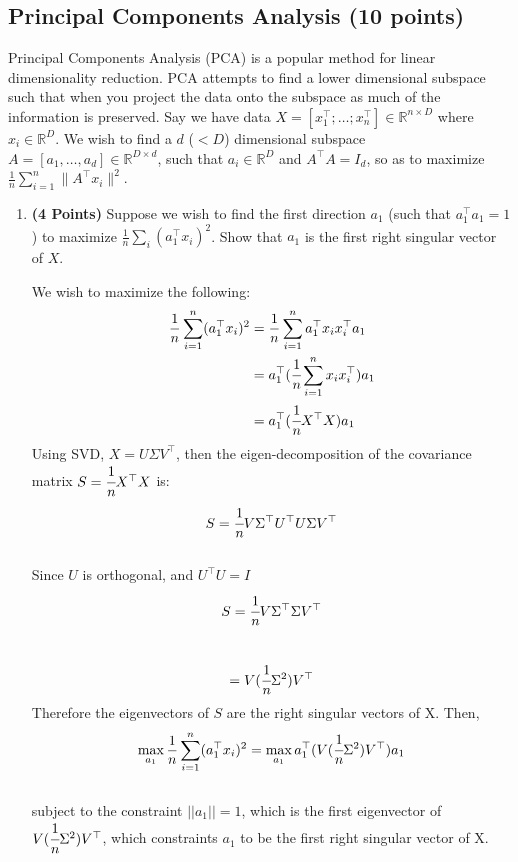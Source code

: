 \documentclass[a4paper]{article}
\theoremstyle{definition}
\newcommand{\RR}{\mathbb{R}}
\newenvironment{soln}{
    \leavevmode\color{blue}\ignorespaces
}{}
\begin{document}
\subsection{Principal Components Analysis  (10 points)}
\label{sec:pca}

Principal Components Analysis (PCA) is a popular method for linear dimensionality reduction. PCA attempts to find a lower dimensional subspace such that when you project the data onto the subspace as much of the information is preserved. Say we have data $X = [x_1^\top; \dots; x_n^\top] \in \RR^{n\times D}$ where  $x_i \in \RR^D$. We wish to find a $d$ ($ < D$) dimensional subspace $A = [a_1, \dots, a_d] \in \RR^{D\times d}$, such that $ a_i \in \RR^D$ and $A^\top A = I_d$, so as to maximize $\frac{1}{n} \sum_{i=1}^n \|A^\top x_i\|^2$.
\begin{enumerate}

\item  \textbf{(4 Points)}
Suppose we wish to find the first direction $a_1$ (such that $a_1^\top a_1 = 1$) to maximize $\frac{1}{n} \sum_i (a_1^\top x_i)^2$.
Show that $a_1$ is the first right singular vector of $X$.

\begin{soln}
    We wish to maximize the following:
    \begin{equation*}
    \begin{split}
    \frac{1}{n} \sum_{i=1}^n (a_1^\top x_i)^2 &= \frac{1}{n} \sum_{i=1}^n a_1^\top x_i x_i^\top a_1 \\
    &= a_1^\top (\cfrac{1}{n}\sum_{i=1}^n x_i x_i^\top) a_1 \\
    &= a_1^\top (\cfrac{1}{n}X^\top X)a_1
    \end{split}
    \end{equation*}
    Using SVD, $X = U\Sigma V^\top$, then the eigen-decomposition of the covariance matrix $S = \cfrac{1}{n}X^\top X$ is: \\
    $$S = \cfrac{1}{n}V\Sigma^\top U^\top U \Sigma V^\top$$\\
    Since $U$ is orthogonal, and $U^\top U = I$ \\
    $$ S = \cfrac{1}{n}V\Sigma^\top \Sigma V^\top$$  \\
    $$   = V (\cfrac{1}{n}\Sigma^2) V^\top$$
    Therefore the eigenvectors of $S$ are the right singular vectors of X. Then,\\
    $$ \max_{a_1} \frac{1}{n} \sum_{i=1}^n (a_1^\top x_i)^2 = \max_{a_1} a_1^\top (V (\cfrac{1}{n}\Sigma^2) V^\top)a_1$$ \\
    subject to the constraint $||a_1|| = 1$, which is the first eigenvector of $V (\cfrac{1}{n}\Sigma^2) V^\top$, which constraints $a_1$ to be the first right singular vector of X.
    

\end{soln}
\end{enumerate}
\end{document}
